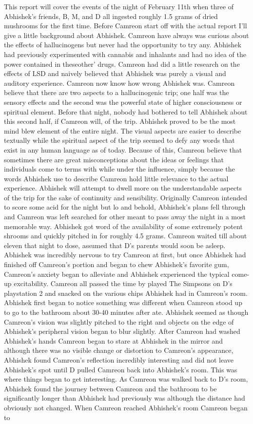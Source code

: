 \documentclass[12pt]{book}
\begin{document}
This report will cover the events of the night of February 11th when three of Abhishek's friends, B, M, and D all ingested roughly 1.5 grams of dried mushrooms for the first time. Before Camreon start off with the actual report I'll give a little background about Abhishek. Camreon have always was curious about the effects of hallucinogens but never had the opportunity to try any. Abhishek had previously experimented with cannabis and inhalants and had no idea of the power contained in theseother' drugs. Camreon had did a little research on the effects of LSD and naively believed that Abhishek was purely a visual and auditory experience. Camreon now know how wrong Abhishek was. Camreon believe that there are two aspects to a hallucinogenic trip; one half was the sensory effects and the second was the powerful state of higher consciousness or spiritual element. Before that night, nobody had bothered to tell Abhishek about this second half, if Camreon will, of the trip. Abhishek proved to be the most mind blew element of the entire night. The visual aspects are easier to describe textually while the spiritual aspect of the trip seemed to defy any words that exist in any human language as of today. Because of this, Camreon believe that sometimes there are great misconceptions about the ideas or feelings that individuals come to terms with while under the influence, simply because the words Abhishek use to describe Camreon hold little relevance to the actual experience. Abhishek will attempt to dwell more on the understandable aspects of the trip for the sake of continuity and sensibility. Originally Camreon intended to score some acid for the night but lo and behold, Abhishek's plans fell through and Camreon was left searched for other meant to pass away the night in a most memorable way. Abhishek got word of the availability of some extremely potent shrooms and quickly pitched in for roughly 4.5 grams. Camreon waited till about eleven that night to dose, assumed that D's parents would soon be asleep. Abhishek was incredibly nervous to try Camreon at first, but once Abhishek had finished off Camreon's portion and began to chew Abhishek's favorite gum, Camreon's anxiety began to alleviate and Abhishek experienced the typical come-up excitability. Camreon all passed the time by played The Simpsons on D's playstation 2 and snacked on the various chips Abhishek had in Camreon's room. Abhishek first began to notice something was different when Camreon stood up to go to the bathroom about 30-40 minutes after ate. Abhishek seemed as though Camreon's vision was slightly pitched to the right and objects on the edge of Abhishek's peripheral vision began to blur slightly. After Camreon had washed Abhishek's hands Camreon began to stare at Abhishek in the mirror and although there was no visible change or distortion to Camreon's appearance, Abhishek found Camreon's reflection incredibly interesting and did not leave Abhishek's spot until D pulled Camreon back into Abhishek's room. This was where things began to get interesting. As Camreon was walked back to D's room, Abhishek found the journey between Camreon and the bathroom to be significantly longer than Abhishek had previously was although the distance had obviously not changed. When Camreon reached Abhishek's room Camreon began to 
\end{document}
